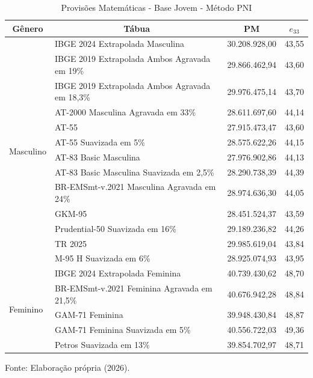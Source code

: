 \begin{table}[htbp]
    \centering
    \caption{Provisões Matemáticas - Base Jovem - Método PNI}
    \begin{threeparttable}
    \renewcommand{\arraystretch}{1.0}
    \begin{tabular}{llrr}
    \toprule
    \multicolumn{1}{c}{\textbf{Gênero}} & \multicolumn{1}{c}{\textbf{Tábua}} & \multicolumn{1}{c}{\textbf{PM}} & \multicolumn{1}{c}{\textbf{$e_{33}$}} \\ \midrule
    \multirow{13}{*}{Masculino}
    & IBGE 2024 Extrapolada Masculina                  & 30.208.928,00 & 43,55 \\
    & IBGE 2019 Extrapolada Ambos Agravada em 19\%      & 29.866.462,94 & 43,60 \\
    & IBGE 2019 Extrapolada Ambos Agravada em 18,3\%    & 29.976.475,14 & 43,70 \\
    & AT-2000 Masculina Agravada em 33\%               & 28.611.697,60 & 44,14 \\
    & AT-55                               & 27.915.473,47 & 43,60 \\
    & AT-55 Suavizada em 5\%                     & 28.575.622,26 & 44,15 \\
    & AT-83 Basic Masculina                       & 27.976.902,86 & 44,13 \\
    & AT-83 Basic Masculina Suavizada em 2,5\%           & 28.290.738,39 & 44,39 \\
    & BR-EMSmt-v.2021 Masculina Agravada em 24\%        & 28.974.636,30 & 44,05 \\
    & GKM-95                              & 28.451.524,37 & 43,59 \\
    & Prudential-50 Suavizada em 16\%            & 29.189.236,82 & 44,26 \\
    & TR 2025                             & 29.985.619,04 & 43,84 \\
    & M-95 H Suavizada em 6\%                    & 28.925.074,93 & 43,95 \\ \hline
    \multirow{5}{*}{Feminino}
    & IBGE 2024 Extrapolada Feminina                  & 40.739.430,62 & 48,70 \\
    & BR-EMSmt-v.2021 Feminina Agravada em 21,5\%     & 40.676.942,28 & 48,84 \\
    & GAM-71 Feminina                            & 39.948.430,84 & 48,87 \\
    & GAM-71 Feminina Suavizada em 5\%                   & 40.556.722,03 & 49,36 \\
    & Petros Suavizada em 13\%               & 39.854.702,97 & 48,71 \\ \bottomrule
    \end{tabular}
    \begin{tablenotes}[flushleft]
        \small
        \item Fonte: Elaboração própria (2026).
    \end{tablenotes}
    \end{threeparttable}
    \label{tab:jovem-pni}
\end{table}
